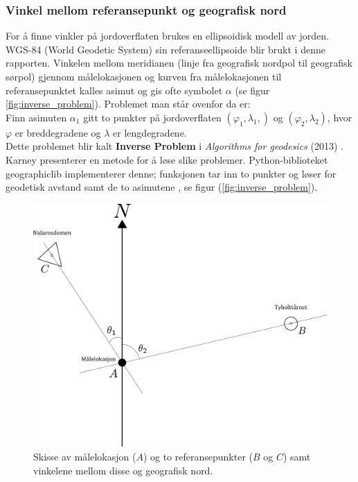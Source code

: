 \subsubsection{Vinkel mellom referansepunkt og geografisk nord}

For å finne vinkler på jordoverflaten brukes en ellipsoidisk modell av jorden.
WGS-84 (World Geodetic System) sin referanseellipsoide blir brukt i denne rapporten.
Vinkelen mellom meridianen (linje fra geografisk nordpol til geografisk sørpol) gjennom målelokasjonen og 
kurven fra målelokasjonen til referansepunktet kalles asimut \cite{asimut} og gis ofte symbolet $\alpha$ (se figur \ref{fig:inverse_problem}).
Problemet man står ovenfor da er:
\\

Finn asimuten $\alpha_1$ gitt to punkter på jordoverflaten $(\varphi_1, \lambda_1, )$ og $(\varphi_2, \lambda_2)$, hvor $\varphi$ er breddegradene og $\lambda$ er lengdegradene. 
\\

Dette problemet blir kalt \textbf{Inverse Problem} i \textit{Algorithms for geodesics} (2013) \cite{Karney}. Karney presenterer en metode for å løse slike problemer. Python-biblioteket geographiclib implementerer denne; funksjonen  tar inn to punkter og løser for geodetisk avstand samt de to asimutene \cite{geographiclib}, se figur (\ref{fig:inverse_problem}).

\begin{figure}[ht]
    \centering
    \includegraphics[width=\textwidth, trim={0 100 0 0}, clip]{img/angle_north.pdf}
    \caption{
    Skisse av målelokasjon ($A$) og to referansepunkter ($B$ og $C$) samt vinkelene mellom disse og geografisk nord.}
    \label{fig:angle_north}
\end{figure}


